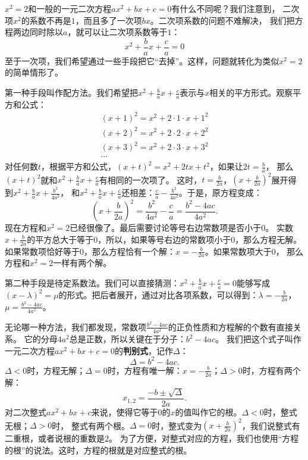 \documentclass[12pt,UTF8]{ctexbook}
\begin{document}
$x^2 = 2$和一般的一元二次方程$ax^2 + bx + c = 0$有什么不同呢？我们注意到，
二次项$x^2$的系数不再是$1$，而且多了一次项$bx$。二次项系数的问题不难解决，
我们把方程两边同时除以$a$，就可以让二次项系数等于$1$：
$$ x^2 + \frac{b}{a} x + \frac{c}{a} = 0$$
至于一次项，我们希望通过一些手段把它“去掉”。这样，问题就转化为类似$x^2 = 2$的简单情形了。

第一种手段叫作配方法。我们希望把$x^2 + \frac{b}{a}x + \frac{c}{a}$表示与$x$相关的平方形式。观察平方和公式：
\begin{align*}
    (x + 1)^2 = x^2 + 2\cdot 1\cdot x + 1^2  \\
    (x + 2)^2 = x^2 + 2\cdot 2\cdot x + 2^2  \\
    (x + 3)^2 = x^2 + 2\cdot 3\cdot x + 3^2  \\
    \cdots 
\end{align*}
对任何数$t$，根据平方和公式，$(x + t)^2 = x^2 + 2tx + t^2$，如果让$2t = \frac{b}{a}$，
那么$(x + t)^2$就和$x^2 + \frac{b}{a}x + \frac{c}{a}$有相同的一次项了。
这时，$t = \frac{b}{2a}$，$(x + \frac{b}{2a})^2$展开得到$x^2 + \frac{b}{a}x + \frac{b^2}{4a^2} $，
和$x^2 + \frac{b}{a}x + \frac{c}{a}$还相差：$\frac{c}{a} - \frac{b^2}{4a^2}$。于是，原方程变成：
$$ \left(x + \frac{b}{2a}\right)^2 = \frac{b^2}{4a^2} - \frac{c}{a} = \frac{b^2 - 4ac}{4a^2}.$$
现在方程和$x^2 = 2$已经很像了。最后需要讨论等号右边常数项是否小于$0$。
实数$x + \frac{b}{2a}$的平方总大于等于$0$，所以，如果等号右边的常数项小于$0$，那么方程无解。
如果常数项恰好等于$0$，那么方程恰有一个解：$x = -\frac{b}{2a}$。如果常数项大于$0$，
那么方程和$x^2 = 2$一样有两个解。

第二种手段是待定系数法。我们可以直接猜测：$x^2 + \frac{b}{a} x + \frac{c}{a} = 0$能够写成
$(x - \lambda)^2 = \mu$的形式。把后者展开，通过对比各项系数，可以得到：$\lambda = -\frac{b}{2a}$，
$\mu = \frac{b^2 - 4ac}{4a^2}$。

无论哪一种方法，我们都发现，常数项$\frac{b^2 - 4ac}{4a^2}$的正负性质和方程解的个数有直接关系。
它的分母$4a^2$总是正数，所以关键在于分子：$b^2 - 4ac$。
我们把这个式子叫作一元二次方程$ax^2 + bx + c = 0$的\textbf{判别式}，记作$\Delta$：
$$\Delta = b^2 - 4ac.$$
$\Delta<0$时，方程无解；$\Delta = 0$时，方程有唯一解：$x = -\frac{b}{2a}$；$\Delta>0$时，方程有两个解：
$$x_{1,2} = \frac{-b \pm \sqrt{\Delta}}{2a}.$$
对二次整式$ax^2 + bx + c$来说，使得它等于$0$的$x$的值叫作它的根。$\Delta<0$时，整式无根；$\Delta>0$时，
整式有两个根。$\Delta = 0$时，整式变为$(x + \frac{b}{2a})^2$，我们说整式有二重根，或者说根的重数是$2$。
为了方便，对整式对应的方程，我们也使用“方程的根”的说法。这时，方程的根就是对应整式的根。
\end{document}
